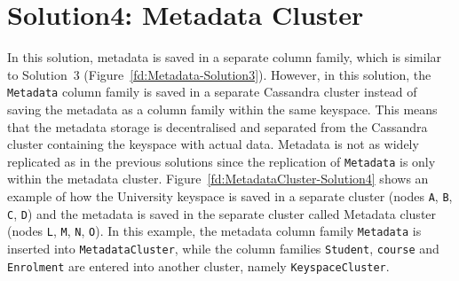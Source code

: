 \section{Solution4:  Metadata Cluster} \label{s:design-sol4}

In this solution,  metadata  is saved in a separate column family,  which is
similar to Solution~3 (Figure~\ref{fd:Metadata-Solution3}). 
However,  in this solution,  the \texttt{Metadata} column family is saved in a
separate Cassandra cluster instead of saving the metadata as a column family
within the same keyspace.  This means that the metadata storage
is decentralised and separated from the Cassandra cluster containing the
keyspace with actual data. 
Metadata  is not as widely replicated as in the previous solutions since the
replication of \texttt{Metadata} is only within the metadata cluster. 
Figure~\ref{fd:MetadataCluster-Solution4} shows an example of how the University
keyspace is saved in a separate cluster (nodes \texttt{A}, \texttt{B}, 
\texttt{C},  \texttt{D}) and the metadata is saved in the separate cluster called
Metadata cluster (nodes \texttt{L}, \texttt{M}, 
\texttt{N},  \texttt{O}).  
In this example,  the metadata column family \texttt{Metadata} is
inserted into \texttt{MetadataCluster},  while the column
families \texttt{Student},  \texttt{course} and \texttt{Enrolment} are entered
into another cluster,  namely \texttt{KeyspaceCluster}. 

